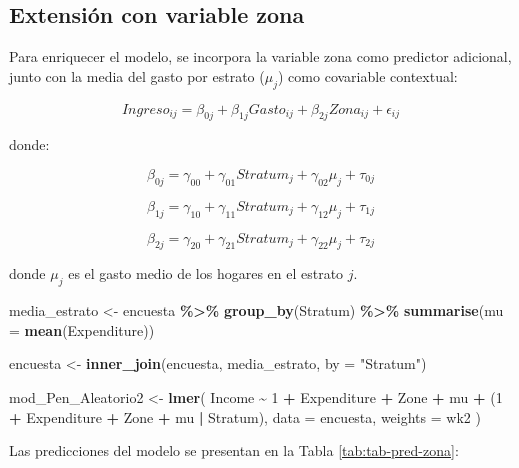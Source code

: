 \documentclass[
  spanish,
  12pt,
]{book}
\newenvironment{Shaded}{\begin{snugshade}}{\end{snugshade}}
\newcommand{\AttributeTok}[1]{\textcolor[rgb]{0.13,0.29,0.53}{#1}}
\newcommand{\DecValTok}[1]{\textcolor[rgb]{0.00,0.00,0.81}{#1}}
\newcommand{\FunctionTok}[1]{\textcolor[rgb]{0.13,0.29,0.53}{\textbf{#1}}}
\newcommand{\NormalTok}[1]{#1}
\newcommand{\OtherTok}[1]{\textcolor[rgb]{0.56,0.35,0.01}{#1}}
\newcommand{\SpecialCharTok}[1]{\textcolor[rgb]{0.81,0.36,0.00}{\textbf{#1}}}
\newcommand{\StringTok}[1]{\textcolor[rgb]{0.31,0.60,0.02}{#1}}
\begin{document}
\subsection{Extensión con variable zona}\label{sec-modelo-con-zona}

Para enriquecer el modelo, se incorpora la variable zona como predictor adicional, junto con la media del gasto por estrato (\(\mu_j\)) como covariable contextual:

\[
Ingreso_{ij} = \beta_{0j} + \beta_{1j} Gasto_{ij} + \beta_{2j} Zona_{ij} + \epsilon_{ij}
\]

donde:

\[
\beta_{0j} = \gamma_{00} + \gamma_{01} Stratum_j + \gamma_{02} \mu_j + \tau_{0j}
\]

\[
\beta_{1j} = \gamma_{10} + \gamma_{11} Stratum_j + \gamma_{12} \mu_j + \tau_{1j}
\]

\[
\beta_{2j} = \gamma_{20} + \gamma_{21} Stratum_j + \gamma_{22} \mu_j + \tau_{2j}
\]

donde \(\mu_j\) es el gasto medio de los hogares en el estrato \(j\).

\begin{Shaded}
\begin{Highlighting}[]
\NormalTok{media\_estrato }\OtherTok{\textless{}{-}}\NormalTok{ encuesta }\SpecialCharTok{\%\textgreater{}\%}
  \FunctionTok{group\_by}\NormalTok{(Stratum) }\SpecialCharTok{\%\textgreater{}\%}
  \FunctionTok{summarise}\NormalTok{(}\AttributeTok{mu =} \FunctionTok{mean}\NormalTok{(Expenditure))}

\NormalTok{encuesta }\OtherTok{\textless{}{-}} \FunctionTok{inner\_join}\NormalTok{(encuesta, media\_estrato, }\AttributeTok{by =} \StringTok{"Stratum"}\NormalTok{)}

\NormalTok{mod\_Pen\_Aleatorio2 }\OtherTok{\textless{}{-}} \FunctionTok{lmer}\NormalTok{(}
\NormalTok{  Income }\SpecialCharTok{\textasciitilde{}} \DecValTok{1} \SpecialCharTok{+}\NormalTok{ Expenditure }\SpecialCharTok{+}\NormalTok{ Zone }\SpecialCharTok{+}\NormalTok{ mu }\SpecialCharTok{+}\NormalTok{ (}\DecValTok{1} \SpecialCharTok{+}\NormalTok{ Expenditure }\SpecialCharTok{+}\NormalTok{ Zone }\SpecialCharTok{+}\NormalTok{ mu }\SpecialCharTok{|}\NormalTok{ Stratum),}
  \AttributeTok{data =}\NormalTok{ encuesta, }\AttributeTok{weights =}\NormalTok{ wk2}
\NormalTok{)}
\end{Highlighting}
\end{Shaded}

Las predicciones del modelo se presentan en la Tabla \ref{tab:tab-pred-zona}:
\end{document}
